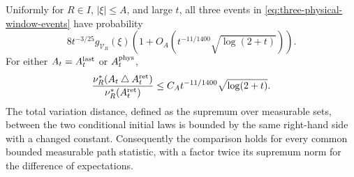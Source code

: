 \begin{theorem}
\label{thm:relative-physical-window}
Uniformly for $R\in I$, $|\xi|\le A$, and large $t$, all three events
in \eqref{eq:three-physical-window-events} have probability
\begin{equation}\label{eq:physical-window-denominator}
 8t^{-3/25}g_{\mathcal V_R}(\xi)
       \left(1+O_A(t^{-11/1400}\sqrt{\log(2+t)})\right).
\end{equation}
For either $A_t=A_t^{\rm last}$ or $A_t^{\rm phys}$,
\begin{equation}\label{eq:relative-physical-window}
 \frac{\nu_R^*(A_t\mathbin\triangle A_t^{\rm ret})}
                    {\nu_R^*(A_t^{\rm ret})}
       \le C_A t^{-11/1400}\sqrt{\log(2+t)}.
\end{equation}
The total variation distance, defined as the supremum over measurable
sets, between the two conditional initial laws is bounded by the same
right-hand side with a changed constant. Consequently the comparison
holds for every common bounded measurable path statistic, with a
factor twice its supremum norm for the difference of expectations.
\end{theorem}
